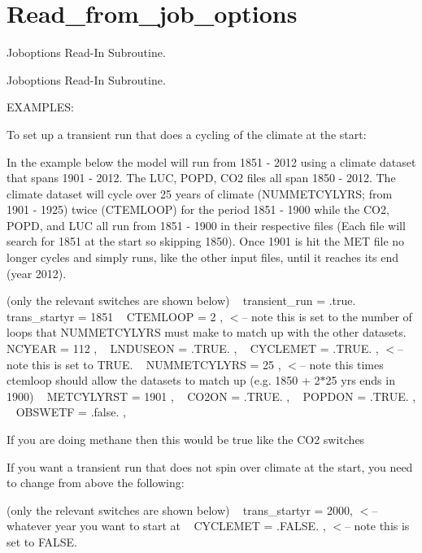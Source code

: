 \hypertarget{group__read__from__job__options}{}\section{Read\+\_\+from\+\_\+job\+\_\+options}
\label{group__read__from__job__options}


Joboptions Read-\/\+In Subroutine.  


Joboptions Read-\/\+In Subroutine. 

E\+X\+A\+M\+P\+L\+E\+S\+:

To set up a transient run that does a cycling of the climate at the start\+:

In the example below the model will run from 1851 -\/ 2012 using a climate dataset that spans 1901 -\/ 2012. The L\+U\+C, P\+O\+P\+D, C\+O2 files all span 1850 -\/ 2012. The climate dataset will cycle over 25 years of climate (N\+U\+M\+M\+E\+T\+C\+Y\+L\+Y\+R\+S; from 1901 -\/ 1925) twice (C\+T\+E\+M\+L\+O\+O\+P) for the period 1851 -\/ 1900 while the C\+O2, P\+O\+P\+D, and L\+U\+C all run from 1851 -\/ 1900 in their respective files (Each file will search for 1851 at the start so skipping 1850). Once 1901 is hit the M\+E\+T file no longer cycles and simply runs, like the other input files, until it reaches its end (year 2012).

(only the relevant switches are shown below) ~\newline
 transient\+\_\+run = .true. ~\newline
 trans\+\_\+startyr = 1851 ~\newline
 C\+T\+E\+M\+L\+O\+O\+P = 2 , $<$-- note this is set to the number of loops that N\+U\+M\+M\+E\+T\+C\+Y\+L\+Y\+R\+S must make to match up with the other datasets. ~\newline
 N\+C\+Y\+E\+A\+R = 112 , ~\newline
 L\+N\+D\+U\+S\+E\+O\+N = .T\+R\+U\+E. , ~\newline
 C\+Y\+C\+L\+E\+M\+E\+T = .T\+R\+U\+E. , $<$-- note this is set to T\+R\+U\+E. ~\newline
 N\+U\+M\+M\+E\+T\+C\+Y\+L\+Y\+R\+S = 25 , $<$-- note this times ctemloop should allow the datasets to match up (e.\+g. 1850 + 2$\ast$25 yrs ends in 1900) ~\newline
 M\+E\+T\+C\+Y\+L\+Y\+R\+S\+T = 1901 , ~\newline
 C\+O2\+O\+N = .T\+R\+U\+E. , ~\newline
 P\+O\+P\+D\+O\+N = .T\+R\+U\+E. , ~\newline
 O\+B\+S\+W\+E\+T\+F = .false. ,

If you are doing methane then this would be true like the C\+O2 switches 



If you want a transient run that does not spin over climate at the start, you need to change from above the following\+:

(only the relevant switches are shown below) ~\newline
 trans\+\_\+startyr = 2000, $<$-- whatever year you want to start at ~\newline
 C\+Y\+C\+L\+E\+M\+E\+T = .F\+A\+L\+S\+E. , $<$-- note this is set to F\+A\+L\+S\+E. 